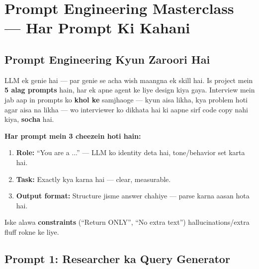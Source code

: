 \newpage

\section{Prompt Engineering Masterclass --- Har Prompt Ki Kahani}

\subsection{Prompt Engineering Kyun Zaroori Hai}

\begin{storybox}
LLM ek genie hai --- par genie se acha wish maangna ek skill hai. Is project mein \textbf{5 alag prompts} hain, har ek apne agent ke liye design kiya gaya. Interview mein jab aap in prompts ko \textbf{khol ke} samjhaoge --- kyun aisa likha, kya problem hoti agar aisa na likha --- wo interviewer ko dikhata hai ki aapne sirf code copy nahi kiya, \textbf{socha} hai.
\end{storybox}

\begin{conceptbox}
\textbf{Har prompt mein 3 cheezein hoti hain:}
\begin{enumerate}[label=\arabic*.]
\item \textbf{Role:} ``You are a ...'' --- LLM ko identity deta hai, tone/behavior set karta hai.
\item \textbf{Task:} Exactly kya karna hai --- clear, measurable.
\item \textbf{Output format:} Structure jisme answer chahiye --- parse karna aasan hota hai.
\end{enumerate}
Iske alawa \textbf{constraints} (``Return ONLY'', ``No extra text'') hallucinations/extra fluff rokne ke liye.
\end{conceptbox}

\subsection{Prompt 1: Researcher ka Query Generator}

